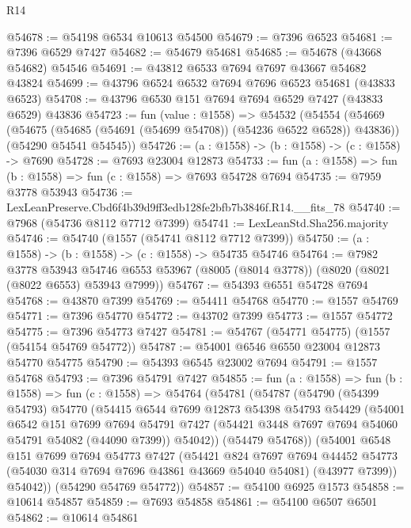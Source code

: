 \begin{lexlean}{R14}
\begin{coremodule}
@54678 := @54198 @6534 @10613 @54500
@54679 := @7396 @6523
@54681 := @7396 @6529 @7427
@54682 := @54679 @54681
@54685 := @54678 (@43668 @54682) @54546
@54691 := @43812 @6533 @7694 @7697 @43667 @54682 @43824
@54699 := @43796 @6524 @6532 @7694 @7696 @6523 @54681 (@43833 @6523)
@54708 := @43796 @6530 @151 @7694 @7694 @6529 @7427 (@43833 @6529) @43836
@54723 := fun (value : @1558) =>
  @54532
    (@54554
      (@54669 (@54675 (@54685 (@54691 (@54699 @54708)) (@54236 @6522 @6528)) @43836))
      (@54290 @54541 @54545))
@54726 := (a : @1558) -> (b : @1558) -> (c : @1558) -> @7690
@54728 := @7693 @23004 @12873
@54733 := fun (a : @1558) => fun (b : @1558) => fun (c : @1558) => @7693 @54728 @7694
@54735 := @7959 @3778 @53943
@54736 := LexLeanPreserve.Cbd6f4b39d9ff3edb128fe2bfb7b3846f.R14.__fits_78
@54740 := @7968 (@54736 @8112 @7712 @7399)
@54741 := LexLeanStd.Sha256.majority
@54746 := @54740 (@1557 (@54741 @8112 @7712 @7399))
@54750 := (a : @1558) -> (b : @1558) -> (c : @1558) -> @54735 @54746
@54764 := @7982
    @3778
    @53943
    @54746
    @6553
    @53967
    (@8005 (@8014 @3778))
    (@8020 (@8021 (@8022 @6553) @53943 @7999))
@54767 := @54393 @6551 @54728 @7694
@54768 := @43870 @7399
@54769 := @54411 @54768
@54770 := @1557 @54769
@54771 := @7396 @54770
@54772 := @43702 @7399
@54773 := @1557 @54772
@54775 := @7396 @54773 @7427
@54781 := @54767 (@54771 @54775) (@1557 (@54154 @54769 @54772))
@54787 := @54001 @6546 @6550 @23004 @12873 @54770 @54775
@54790 := @54393 @6545 @23002 @7694
@54791 := @1557 @54768
@54793 := @7396 @54791 @7427
@54855 := fun (a : @1558) =>
  fun (b : @1558) =>
  fun (c : @1558) =>
  @54764
    (@54781
      (@54787
        (@54790
          (@54399 @54793)
          @54770
          (@54415
            @6544
            @7699
            @12873
            @54398
            @54793
            @54429
            (@54001
              @6542
              @151
              @7699
              @7694
              @54791
              @7427
              (@54421 @3448 @7697 @7694 @54060 @54791 @54082 (@44090 @7399))
              @54042))
          (@54479 @54768))
        (@54001
          @6548
          @151
          @7699
          @7694
          @54773
          @7427
          (@54421
            @824
            @7697
            @7694
            @44452
            @54773
            (@54030 @314 @7694 @7696 @43861 @43669 @54040 @54081)
            (@43977 @7399))
          @54042))
      (@54290 @54769 @54772))
@54857 := @54100 @6925 @1573
@54858 := @10614 @54857
@54859 := @7693 @54858
@54861 := @54100 @6507 @6501
@54862 := @10614 @54861

\end{coremodule}
\end{lexlean}
